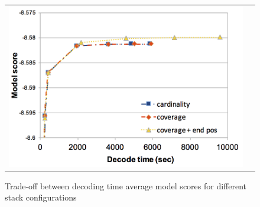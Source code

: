 \documentclass[]{article}
\begin{document}
\begin{figure}[h]
\centering
\begin{tabular}{cc}
{\includegraphics[scale=0.4]{stack-configuration.png}} 
\end{tabular}
\caption{Trade-off between decoding time average model scores for different stack configurations}
\label{fig:stack-configuration}
\end{figure} 
\end{document}
